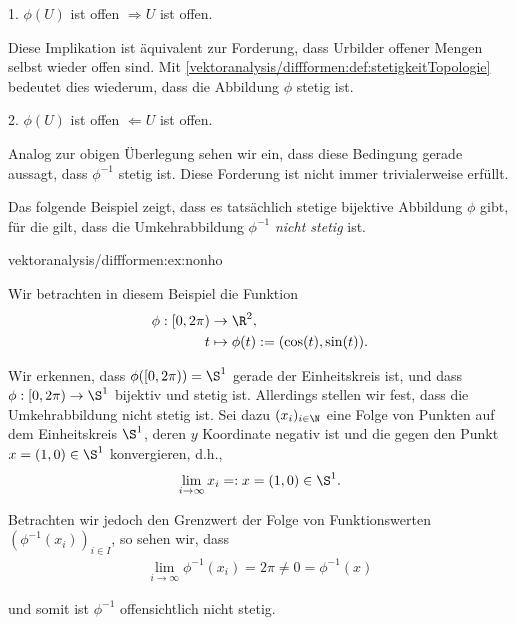 \documentclass[letterpaper,10pt,english]{jupyterBook}
\begin{document}
\par
1. \(\phi(U)\) ist offen \(\Rightarrow U \) ist offen.

\par
Diese Implikation ist äquivalent zur Forderung, dass Urbilder offener Mengen selbst wieder offen sind.
Mit \cref{vektoranalysis/diffformen:def:stetigkeitTopologie} bedeutet dies wiederum, dass die Abbildung \(\phi\) stetig ist.

\par
2. \(\phi(U)\) ist offen \(\Leftarrow U \) ist offen.

\par
Analog zur obigen Überlegung sehen wir ein, dass diese Bedingung gerade aussagt, dass \(\phi^{-1}\) stetig ist.
Diese Forderung ist nicht immer trivialerweise erfüllt.

\par
Das folgende Beispiel zeigt, dass es tatsächlich stetige bijektive Abbildung \(\phi\) gibt, für die gilt, dass die Umkehrabbildung \(\phi^{-1}\) \emph{nicht stetig} ist.
\begin{example}{}{vektoranalysis/diffformen:ex:nonho}



\par
Wir betrachten in diesem Beispiel die Funktion
\begin{align*}
\phi:[0,2\pi)&\to\R^2,\\
t &\mapsto \phi(t):= (\cos(t), \sin(t)).
\end{align*}
\par
Wir erkennen, dass \(\phi([0,2\pi)) = \S^1\) gerade der Einheitskreis ist, und dass \(\phi:[0,2\pi)\to\S^1\) bijektiv und stetig ist.
Allerdings stellen wir fest, dass die Umkehrabbildung nicht stetig ist.
Sei dazu \((x_i)_{i\in\N}\) eine Folge von Punkten auf dem Einheitskreis \(\S^1\), deren \(y\) Koordinate negativ ist und die gegen den Punkt \(x = (1,0) \in \S^1\) konvergieren, d.h.,
\begin{align*}
\lim_{i\rightarrow\infty} x_i =: x = (1,0) \in \S^1.
\end{align*}
\par
Betrachten wir jedoch den Grenzwert der Folge von Funktionswerten \((\phi^{-1}(x_i))_{i\in I}\), so sehen wir, dass
\begin{align*}
\lim_{i\to\infty} \phi^{-1} (x_i) = 2\pi \neq 0 = \phi^{-1}(x)
\end{align*}
\par
und somit ist \(\phi^{-1}\) offensichtlich nicht stetig.
\end{example}
\end{document}

